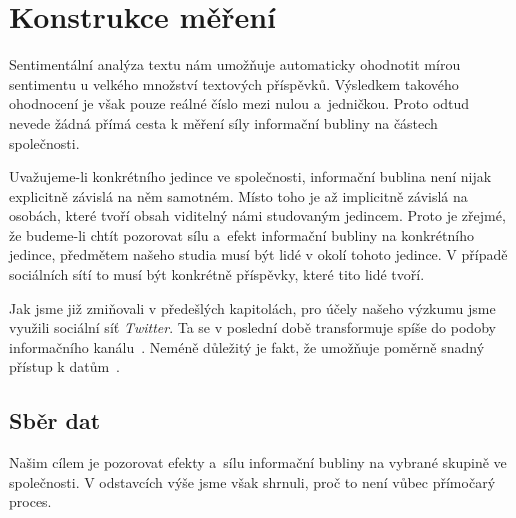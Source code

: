 \documentclass[12pt, a4paper]{article}
\numberwithin{equation}{section} 	%
\begin{document}
\newpage
\section{Konstrukce měření}
\noindent Sentimentální analýza textu nám umožňuje automaticky ohodnotit mírou sentimentu u velkého množství textových příspěvků. Výsledkem takového ohodnocení je však pouze reálné číslo mezi nulou a~jedničkou. Proto odtud nevede žádná přímá cesta k měření síly informační bubliny na částech společnosti.

Uvažujeme-li konkrétního jedince ve společnosti, informační bublina není nijak explicitně závislá na něm samotném. Místo toho je až implicitně závislá na osobách, které tvoří obsah viditelný námi studovaným jedincem. Proto je zřejmé, že budeme-li chtít pozorovat sílu a~efekt informační bubliny na konkrétního jedince, předmětem našeho studia musí být lidé v okolí tohoto jedince. V případě sociálních sítí to musí být konkrétně příspěvky, které tito lidé tvoří.

Jak jsme již zmiňovali v předešlých kapitolách, pro účely našeho výzkumu jsme využili sociální síť \textit{Twitter}. Ta se v poslední době transformuje spíše do podoby informačního kanálu~\cite{whyNotFb}. Neméně důležitý je fakt, že umožňuje poměrně snadný přístup k datům~\cite{tweepy, twitterAPI}.

\subsection{Sběr dat}
\noindent Našim cílem je pozorovat efekty a~sílu informační bubliny na vybrané skupině ve společnosti. V odstavcích výše jsme však shrnuli, proč to není vůbec přímočarý proces.
\end{document}
